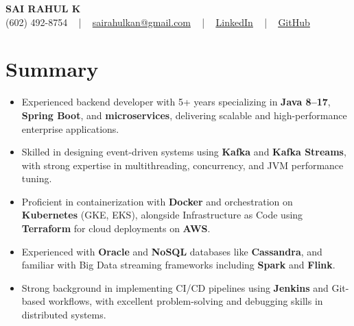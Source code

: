 \documentclass[letterpaper,11pt]{article}
\newcommand{\resumeItem}[1]{
  \item\footnotesize{
    {#1 \vspace{-2pt}}
  }
}
\newcommand{\resumeItemListStart}{\begin{itemize}[leftmargin=*]}
\newcommand{\resumeItemListEnd}{\end{itemize}\vspace{-5pt}}
\begin{document}
\begin{center}
    {\fontsize{14pt}{12pt}\selectfont \textbf{\MakeUppercase{Sai Rahul K}}}\\ \vspace{2pt}
    \fontsize{10pt}{12pt}\selectfont (602) 492-8754 ~ | ~ \href{mailto:sairahulkan@gmail.com}{sairahulkan@gmail.com} ~ | ~
    \href{https://www.linkedin.com/in/rq123/}{\color{blue}\underline{LinkedIn}} ~ | ~
    \href{https://github.com/kanrahuldo}{\color{blue}\underline{GitHub}}~
    \vspace{-8pt}
\end{center}

\section{Summary}
\fontsize{9pt}{10pt}\selectfont
\resumeItemListStart
    \resumeItem{Experienced backend developer with 5+ years specializing in \textbf{Java 8--17}, \textbf{Spring Boot}, and \textbf{microservices}, delivering scalable and high-performance enterprise applications.}
    \resumeItem{Skilled in designing event-driven systems using \textbf{Kafka} and \textbf{Kafka Streams}, with strong expertise in multithreading, concurrency, and JVM performance tuning.}
    \resumeItem{Proficient in containerization with \textbf{Docker} and orchestration on \textbf{Kubernetes} (GKE, EKS), alongside Infrastructure as Code using \textbf{Terraform} for cloud deployments on \textbf{AWS}.}
    \resumeItem{Experienced with \textbf{Oracle} and \textbf{NoSQL} databases like \textbf{Cassandra}, and familiar with Big Data streaming frameworks including \textbf{Spark} and \textbf{Flink}.}
    \resumeItem{Strong background in implementing CI/CD pipelines using \textbf{Jenkins} and Git-based workflows, with excellent problem-solving and debugging skills in distributed systems.}
\resumeItemListEnd
\vspace{-6pt}
\end{document}

